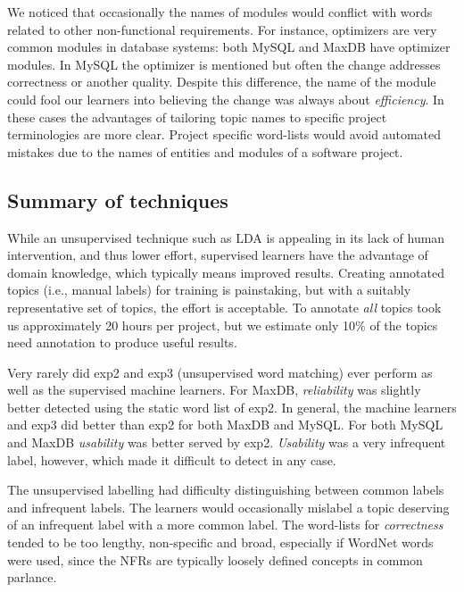 \documentclass[]{sig-alternate}
\begin{document}
We noticed that occasionally the names of modules would conflict with words related to other non-functional requirements. 
For instance, optimizers are very common modules in database systems: both MySQL and MaxDB have optimizer modules. 
In MySQL the optimizer is mentioned but often the change addresses  correctness or another quality. 
Despite this difference, the name of the module could fool our learners into believing the change was always about \emph{efficiency}. 
In these cases the advantages of tailoring topic names to specific project terminologies are more clear. 
Project specific word-lists would avoid automated mistakes due to the names of entities and modules of a software project.

\subsection{Summary of techniques}
While an unsupervised technique such as LDA is appealing in its lack of human intervention, and thus lower effort, 
supervised learners have the advantage of domain knowledge, which typically means improved results. 
Creating annotated topics (i.e., manual labels) for training is painstaking, but with a suitably representative set of topics, the effort is acceptable. To annotate \emph{all} topics took us approximately 20 hours per project, but we estimate only 10\% of the topics need annotation to produce useful results.

Very rarely did \textsf{exp2} and \textsf{exp3} (unsupervised word matching) ever perform as well as the supervised machine learners. 
For MaxDB, \textit{reliability} was slightly better detected using the static word list of \textsf{exp2}. 
In general, the machine learners and \textsf{exp3} did better than \textsf{exp2} for both MaxDB and MySQL. 
For both MySQL and MaxDB \textit{usability} was better served by \textsf{exp2}. 
\textit{Usability} was a very infrequent label, however, which made it difficult to detect in any case.

The unsupervised labelling had difficulty distinguishing between common labels and infrequent labels. 
The learners would occasionally mislabel a topic deserving of an infrequent label with a more common label.
The word-lists for \emph{correctness} tended to be too lengthy, non-specific and broad, especially if WordNet words were used, since the NFRs are typically loosely defined concepts in common parlance.
\end{document}
